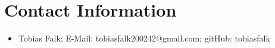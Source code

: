 \chapter*{Contact Information}
\thispagestyle{fancy}
\begin{itemize}
	\item Tobias Falk; E-Mail: tobiasfalk200242@gmail.com; gitHub: tobiasfalk
\end{itemize}
